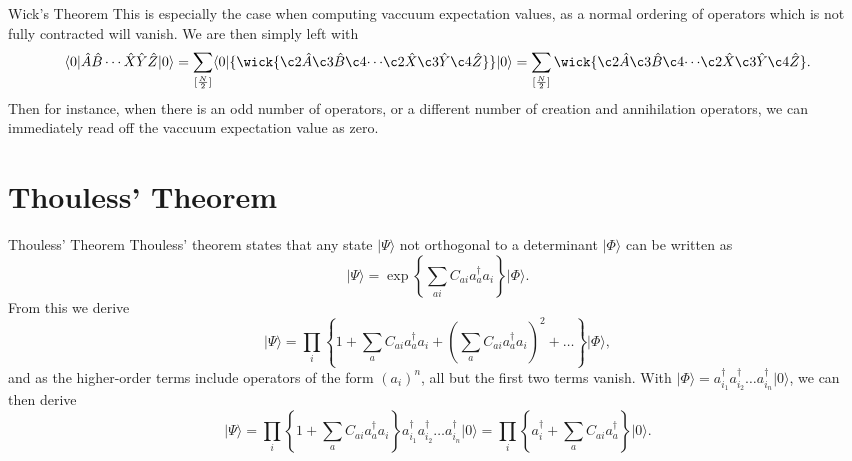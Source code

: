 \documentclass[UKenglish,aspectratio=169]{beamer}
\begin{document}
\begin{frame}{Wick's Theorem}
    This is especially the case when computing vaccuum expectation values, as a normal ordering of operators which is not fully contracted will vanish.
    We are then simply left with
    \begin{equation}
        \langle 0 \vert \hat{A} \hat{B} \cdots \hat{X} \hat{Y} \hat{Z} \vert 0 \rangle
        = \sum_{[\frac{N}{2}]} \langle 0 \lvert \{ \wick{\c2{\hat{A}} \c3{\hat{B}} \c4{\cdots} \c2{\hat{X}} \c3{\hat{Y}} \c4{\hat{Z}}} \} \rvert 0 \rangle
        = \sum_{[\frac{N}{2}]} \wick{\c2{\hat{A}} \c3{\hat{B}} \c4{\cdots} \c2{\hat{X}} \c3{\hat{Y}} \c4{\hat{Z}}}.
    \end{equation}
    Then for instance, when there is an odd number of operators, or a different number of creation and annihilation operators, we can immediately read off the vaccuum expectation value as zero.
\end{frame}

\section{Thouless' Theorem}

\begin{frame}{Thouless' Theorem}
    Thouless' theorem states that any state $\lvert \Psi \rangle$ not orthogonal to a determinant $\lvert \Phi \rangle$ can be written as
    \begin{equation}
        \lvert \Psi \rangle = \exp\left\{ \sum_{ai} C_{ai} a_a^\dagger a_i \right\} \lvert \Phi \rangle.
    \end{equation}
    From this we derive
    \begin{equation}
        \lvert \Psi \rangle = \prod_i \left\{ 1 + \sum_a C_{ai} a_a^\dagger a_i + \left(\sum_a C_{ai} a_a^\dagger a_i \right)^2 + \ldots \right\} \lvert \Phi \rangle,
    \end{equation}
    and as the higher-order terms include operators of the form $(a_i)^n$, all but the first two terms vanish.
    With $\lvert \Phi \rangle = a_{i_1}^\dagger a_{i_2}^\dagger \ldots a_{i_n}^\dagger \lvert 0 \rangle$, we can then derive
    \begin{equation}
        \lvert \Psi \rangle
        = \prod_i \left\{ 1 + \sum_a C_{ai} a_a^\dagger a_i \right\} a_{i_1}^\dagger a_{i_2}^\dagger \ldots a_{i_n}^\dagger \lvert 0 \rangle
        =\prod_i \left\{ a_i^\dagger + \sum_a C_{ai} a_a^\dagger \right\} \lvert 0 \rangle.
    \end{equation}
\end{frame}
\end{document}
